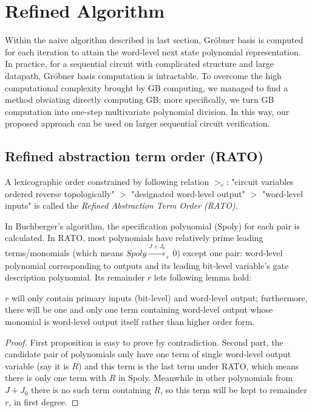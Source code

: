 \section{Refined Algorithm}
Within the naive algorithm described in last section, Gr\"obner basis is computed for each
iteration to attain the word-level next state polynomial representation. In practice, for 
a sequential circuit with complicated structure and large datapath, Gr\"obner basis computation
is intractable. To overcome the high computational complexity brought by GB computing, 
we managed to find a method obviating directly computing GB; more specifically, we turn 
GB computation into one-step multivariate polynomial division. In this way, our proposed 
approach can be used on larger sequential circuit verification.


\subsection{Refined abstraction term order (RATO)}
A lexicographic order constrained by following relation $>_{r}$: "circuit variables ordered reverse topologically" $>$ 
"designated word-level output" $>$ "word-level inputs" is called the \emph{Refined Abstraction Term Order (RATO)}.

In Buchberger's algorithm, the specification polynomial (Spoly) for each pair is calculated. In RATO, most polynomials
have relatively prime leading terms/monomials (which means $Spoly \xrightarrow{J+J_0}_{+} 0$) except one pair:
word-level polynomial corresponding to outputs and its leading bit-level variable's gate description polynomial.
Its remainder $r$ lets following lemma hold:

\begin{Lemma}
\label{lem:1}
$r$ will only contain primary inputs (bit-level) and word-level output; furthermore, there will be one and
only one term containing word-level output whose monomial is word-level output itself rather than higher order form.
\end{Lemma}

\begin{proof}
First proposition is easy to prove by contradiction. Second part, the candidate pair of polynomials only have one term of
single word-level output variable (say it is $R$) and this term is the last term under RATO, which means there is only one term with
$R$ in Spoly. Meanwhile in other polynomials from $J+J_0$ there is no such term containing $R$, so this term will be
kept to remainder $r$, in first degree.
\end{proof}

